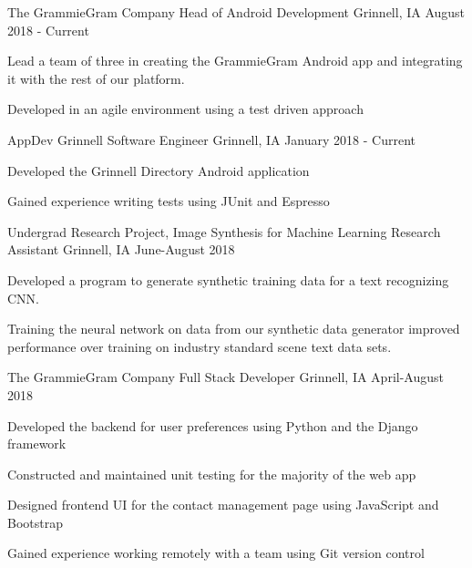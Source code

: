 \documentclass[11pt, a4paper]{awesome-cv}
\begin{document}
\begin{cventries}

  \cventry
    {The GrammieGram Company}
    {Head of Android Development}
    {Grinnell, IA}
    {August 2018 - Current}
    {
      \begin{cvitems}
        \item {Lead a team of three in creating the GrammieGram Android app and integrating it with the rest of our platform.}
	\item {Developed in an agile environment using a test driven approach}
      \end{cvitems}
    }

  \cventry
    {AppDev Grinnell}
    {Software Engineer}
    {Grinnell, IA}
    {January 2018 - Current}
    {
      \begin{cvitems}
        \item {Developed the Grinnell Directory Android application}
	\item {Gained experience writing tests using JUnit and Espresso}
      \end{cvitems}
    }

  \cventry
    {Undergrad Research Project, Image Synthesis for Machine Learning}
    {Research Assistant}
    {Grinnell, IA}
    {June-August 2018}
    {
      \begin{cvitems}
        \item {Developed a program to generate synthetic training data for a text recognizing CNN.}
        \item{Training the neural network on data from our synthetic data generator improved performance over training on industry standard scene text data sets.}
      \end{cvitems}
    }

  \cventry
    {The GrammieGram Company}
    {Full Stack Developer}
    {Grinnell, IA}
    {April-August 2018}
    {
      \begin{cvitems}
        \item {Developed the backend for user preferences using Python and the Django framework}
        \item {Constructed and maintained unit testing for the majority of the web app}
        \item {Designed frontend UI for the contact management page using JavaScript and Bootstrap}
        \item {Gained experience working remotely with a team using Git version control}
      \end{cvitems}
    }


\end{cventries}
\end{document}
